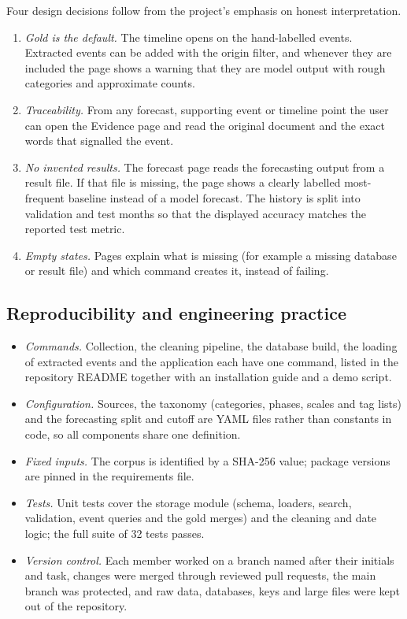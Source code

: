 \documentclass[11pt,a4paper]{article}
\begin{document}
Four design decisions follow from the project's emphasis on honest interpretation.
\begin{enumerate}
\item \emph{Gold is the default.} The timeline opens on the hand-labelled events. Extracted events can be added
with the origin filter, and whenever they are included the page shows a warning that they are model output with
rough categories and approximate counts.
\item \emph{Traceability.} From any forecast, supporting event or timeline point the user can open the Evidence
page and read the original document and the exact words that signalled the event.
\item \emph{No invented results.} The forecast page reads the forecasting output from a result file. If that
file is missing, the page shows a clearly labelled most-frequent baseline instead of a model forecast. The
history is split into validation and test months so that the displayed accuracy matches the reported test
metric.
\item \emph{Empty states.} Pages explain what is missing (for example a missing database or result file) and
which command creates it, instead of failing.
\end{enumerate}

\subsection{Reproducibility and engineering practice}
\label{sec:repro}
\begin{itemize}
\item \emph{Commands.} Collection, the cleaning pipeline, the database build, the loading of extracted events and
the application each have one command, listed in the repository README together with an installation guide and
a demo script.
\item \emph{Configuration.} Sources, the taxonomy (categories, phases, scales and tag lists) and the
forecasting split and cutoff are YAML files rather than constants in code, so all components share one definition.
\item \emph{Fixed inputs.} The corpus is identified by a SHA-256 value; package versions are pinned in the
requirements file.
\item \emph{Tests.} Unit tests cover the storage module (schema, loaders, search, validation, event queries and
the gold merges) and the cleaning and date logic; the full suite of 32 tests passes.
\item \emph{Version control.} Each member worked on a branch named after their initials and task, changes were
merged through reviewed pull requests, the main branch was protected, and raw data, databases, keys and large
files were kept out of the repository.
\end{itemize}
\end{document}
